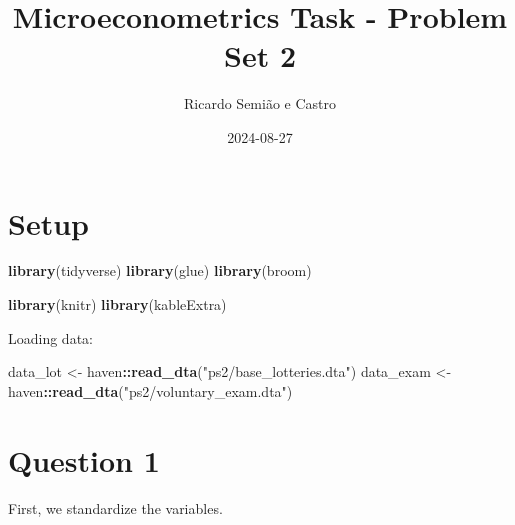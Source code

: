 \documentclass[
]{article}
\title{Microeconometrics Task - Problem Set 2}
\author{Ricardo Semião e Castro}
\date{2024-08-27}
\newenvironment{Shaded}{\begin{snugshade}}{\end{snugshade}}
\newcommand{\FunctionTok}[1]{\textcolor[rgb]{0.13,0.29,0.53}{\textbf{#1}}}
\newcommand{\NormalTok}[1]{#1}
\newcommand{\OtherTok}[1]{\textcolor[rgb]{0.56,0.35,0.01}{#1}}
\newcommand{\SpecialCharTok}[1]{\textcolor[rgb]{0.81,0.36,0.00}{\textbf{#1}}}
\newcommand{\StringTok}[1]{\textcolor[rgb]{0.31,0.60,0.02}{#1}}
\begin{document}
\maketitle

\section{Setup}\label{setup}

\begin{Shaded}
\begin{Highlighting}[]
\FunctionTok{library}\NormalTok{(tidyverse)}
\FunctionTok{library}\NormalTok{(glue)}
\FunctionTok{library}\NormalTok{(broom)}

\FunctionTok{library}\NormalTok{(knitr)}
\FunctionTok{library}\NormalTok{(kableExtra)}
\end{Highlighting}
\end{Shaded}

Loading data:

\begin{Shaded}
\begin{Highlighting}[]
\NormalTok{data\_lot }\OtherTok{\textless{}{-}}\NormalTok{ haven}\SpecialCharTok{::}\FunctionTok{read\_dta}\NormalTok{(}\StringTok{"ps2/base\_lotteries.dta"}\NormalTok{)}
\NormalTok{data\_exam }\OtherTok{\textless{}{-}}\NormalTok{ haven}\SpecialCharTok{::}\FunctionTok{read\_dta}\NormalTok{(}\StringTok{"ps2/voluntary\_exam.dta"}\NormalTok{)}
\end{Highlighting}
\end{Shaded}

\section{Question 1}\label{question-1}

First, we standardize the variables.
\end{document}
